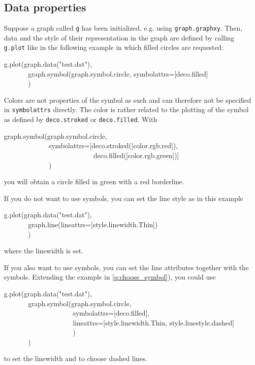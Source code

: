 \documentclass[11pt,DIV14]{scrartcl}
\begin{document}
\subsection{Data properties}

{}
{\label{q:choose_symbol}
Suppose a graph called \texttt{g} has been initialized, e.g. using
\texttt{graph.graphxy}. Then, data and the style of their representation
in the graph are defined by calling \texttt{g.plot} like in the following
example in which filled circles are requested:
\begin{progcode}
g.plot(graph.data("test.dat"),\\
~~~~~~~graph.symbol(graph.symbol.circle, symbolattrs=[deco.filled]\\
~~~~~~~)
\end{progcode}
}

{}
{Colors are not properties of the symbol as such and can therefore not
be specified in \texttt{symbolattrs} directly. The color is rather related
to the plotting of the symbol as defined by \texttt{deco.stroked} or
\texttt{deco.filled}. With
\begin{progcode}
graph.symbol(graph.symbol.circle,\\
~~~~~~~~~~~~~symbolattrs=[deco.stroked([color.rgb.red]),\\
~~~~~~~~~~~~~~~~~~~~~~~~~~deco.filled([color.rgb.green])]\\
~~~~~~~~~~~~~)
\end{progcode}
you will obtain a circle filled in green with a red borderline.
}

{}
{If you do not want to use symbols, you can set the line style as in this
example
\begin{progcode}
g.plot(graph.data("test.dat"),\\
~~~~~~~graph.line(lineattrs=[style.linewidth.Thin])\\
~~~~~~~)
\end{progcode}
where the linewidth is set.

If you also want to use symbols, you can set the line attributes together
with the symbols.  Extending the example in \ref{q:choose_symbol}),
you could use
\begin{progcode}
g.plot(graph.data("test.dat"),\\
~~~~~~~graph.symbol(graph.symbol.circle, \\
~~~~~~~~~~~~~~~~~~~~symbolattrs=[deco.filled],\\
~~~~~~~~~~~~~~~~~~~~lineattrs=[style.linewidth.Thin, style.linestyle.dashed]\\
~~~~~~~~~~~~~~~~~~~~)\\
~~~~~~~)
\end{progcode}
to set the linewidth and to choose dashed lines. 
}
\end{document}
